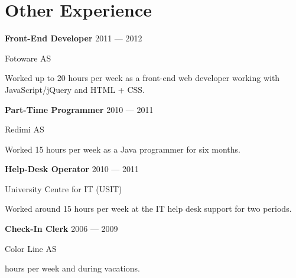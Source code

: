\section{Other Experience}
\parbox[t][][t]{\linewidth}{
	\parbox{\linewidth}{\textbf{Front-End Developer} \hfill {{2011 --- 2012}}}
	\parbox{\linewidth}{Fotoware AS}
	\smallbreak
	\smallskip
	Worked up to 20 hours per week as a front-end web developer working with
	JavaScript/jQuery and HTML + CSS.
	\bigbreak
	\smallskip
}

\parbox[t][][t]{\linewidth}{
	\parbox{\linewidth}{\textbf{Part-Time Programmer} \hfill {{2010 --- 2011}}}
	\parbox{\linewidth}{Redimi AS}
	\smallbreak
	\smallskip
	Worked 15 hours per week as a Java programmer for six months.
	\bigbreak
	\smallskip
}

\parbox[t][][t]{\linewidth}{
	\parbox{\linewidth}{\textbf{Help-Desk Operator} \hfill {{2010 --- 2011}}}
	\parbox{\linewidth}{University Centre for IT (USIT)}
	\smallbreak
	\smallskip
	Worked around 15 hours per week at the IT help desk support for two
	periods.
	\bigbreak
	\smallskip
}


\parbox[t][][t]{\linewidth}{
	\parbox{\linewidth}{\textbf{Check-In Clerk} \hfill {2006 --- 2009}}
	\parbox{\linewidth}{Color Line AS}
	\smallbreak
	 hours per week and during vacations.
	\bigbreak
}

